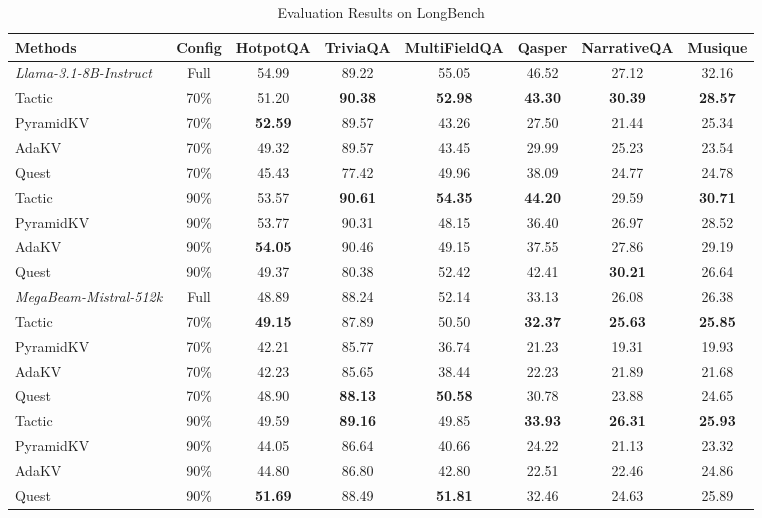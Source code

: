 


\begin{table*}[h!]
\centering


\small
\begin{tabular}{l c|c c c c c c}
\toprule
\hline
\textbf{Methods} & \textbf{Config} & \textbf{HotpotQA} & \textbf{TriviaQA} & \textbf{MultiFieldQA} & \textbf{Qasper} & \textbf{NarrativeQA} & \textbf{Musique} \\
\hline
\textit{Llama-3.1-8B-Instruct}  & Full  & 54.99  & 89.22  & 55.05  & 46.52  & 27.12  & 32.16 \\
Tactic  & 70\%  & 51.20  & \textbf{90.38}  & \textbf{52.98}  & \textbf{43.30}  & \textbf{30.39}  & \textbf{28.57} \\
PyramidKV  & 70\%  & \textbf{52.59}  & 89.57  & 43.26  & 27.50  & 21.44  & 25.34 \\
AdaKV   & 70\%  & 49.32  & 89.57  & 43.45  & 29.99  & 25.23  & 23.54 \\
Quest   & 70\%  & 45.43  & 77.42  & 49.96  & 38.09  & 24.77  & 24.78 \\
Tactic  & 90\%  & 53.57  & \textbf{90.61}  & \textbf{54.35}  & \textbf{44.20}  & 29.59  & \textbf{30.71} \\
PyramidKV  & 90\%  & 53.77  & 90.31  & 48.15  & 36.40  & 26.97  & 28.52 \\
AdaKV   & 90\%  & \textbf{54.05}  & 90.46  & 49.15  & 37.55  & 27.86  & 29.19 \\
Quest   & 90\%  & 49.37  & 80.38  & 52.42  & 42.41  & \textbf{30.21}  & 26.64 \\


\hline
\midrule
\textit{MegaBeam-Mistral-512k }   & Full  & 48.89  & 88.24  & 52.14  & 33.13  & 26.08  & 26.38 \\
Tactic  & 70\%  & \textbf{49.15}  & 87.89  & 50.50  & \textbf{32.37}  & \textbf{25.63}  & \textbf{25.85} \\
PyramidKV  & 70\%  & 42.21  & 85.77   & 36.74  & 21.23  & 19.31  & 19.93 \\
AdaKV   & 70\%  & 42.23  & 85.65  & 38.44  & 22.23  & 21.89  & 21.68 \\
Quest   & 70\%  & 48.90  & \textbf{88.13}  & \textbf{50.58}  & 30.78  & 23.88  & 24.65 \\
Tactic  & 90\%  & 49.59  & \textbf{89.16}  & 49.85  & \textbf{33.93}  & \textbf{26.31}  & \textbf{25.93} \\
PyramidKV  & 90\%  & 44.05  & 86.64   & 40.66  & 24.22  & 21.13  & 23.32 \\
AdaKV   & 90\%  & 44.80  & 86.80   & 42.80  & 22.51  & 22.46  & 24.86 \\
Quest   & 90\%  & \textbf{51.69}  & 88.49  & \textbf{51.81}  & 32.46  & 24.63  & 25.89 \\




\bottomrule

\end{tabular}
\caption{Evaluation Results on LongBench}
\label{tab:longbench}
\end{table*}
